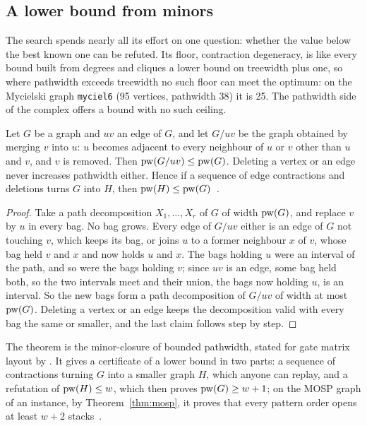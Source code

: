 \subsection{A lower bound from minors}
\label{sec:minor}

The search spends nearly all its effort on one question: whether the value
below the best known one can be refuted. Its floor, contraction degeneracy, is
like every bound built from degrees and cliques a lower bound on treewidth plus
one, so where pathwidth exceeds treewidth no such floor can meet the optimum:
on the Mycielski graph \texttt{myciel6} (95 vertices, pathwidth 38) it is 25.
The pathwidth side of the complex offers a bound with no such ceiling.

\begin{theorem}\label{thm:minor}
Let $G$ be a graph and $uv$ an edge of $G$, and let $G/uv$ be the graph obtained
by merging $v$ into $u$: $u$ becomes adjacent to every neighbour of $u$ or $v$
other than $u$ and $v$, and $v$ is removed. Then $\mathrm{pw}(G/uv)\le\mathrm{pw}(G)$.
Deleting a vertex or an edge never increases pathwidth either. Hence if a
sequence of edge contractions and deletions turns $G$ into $H$, then
$\mathrm{pw}(H)\le\mathrm{pw}(G)$~.
\end{theorem}
\begin{proof}
Take a path decomposition $X_1,\dots,X_r$ of $G$ of width $\mathrm{pw}(G)$, and replace
$v$ by $u$ in every bag. No bag grows. Every edge of $G/uv$ either is an edge of
$G$ not touching $v$, which keeps its bag, or joins $u$ to a former neighbour
$x$ of $v$, whose bag held $v$ and $x$ and now holds $u$ and $x$. The bags
holding $u$ were an interval of the path, and so were the bags holding $v$;
since $uv$ is an edge, some bag held both, so the two intervals meet and their
union, the bags now holding $u$, is an interval. So the new bags form a path
decomposition of $G/uv$ of width at most $\mathrm{pw}(G)$. Deleting a vertex or an
edge keeps the decomposition valid with every bag the same or smaller, and the
last claim follows step by step.
\end{proof}

The theorem is the minor-closure of bounded pathwidth, stated for gate matrix
layout by \citet[Lemma~4.2]{FellowsLangston1987}. It gives a certificate of a
lower bound in two parts: a sequence of contractions turning $G$ into a smaller
graph $H$, which anyone can replay, and a refutation of $\mathrm{pw}(H)\le w$, which
then proves $\mathrm{pw}(G)\ge w+1$; on the MOSP graph of an instance, by
Theorem~\ref{thm:mosp}, it proves that every pattern order opens at least
$w+2$ stacks~.

